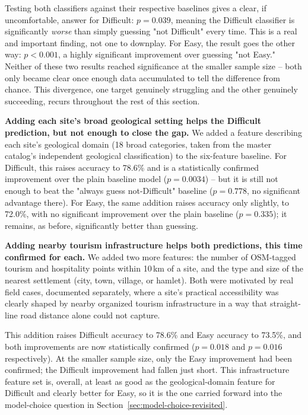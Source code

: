 \documentclass[11pt,a4paper]{article}
\begin{document}
Testing both classifiers against their respective baselines gives a clear, if uncomfortable, answer for Difficult: $p=0.039$, meaning the Difficult classifier is significantly \emph{worse} than simply guessing "not Difficult" every time. This is a real and important finding, not one to downplay. For Easy, the result goes the other way: $p<0.001$, a highly significant improvement over guessing "not Easy." Neither of these two results reached significance at the smaller sample size -- both only became clear once enough data accumulated to tell the difference from chance. This divergence, one target genuinely struggling and the other genuinely succeeding, recurs throughout the rest of this section.

\textbf{Adding each site's broad geological setting helps the Difficult prediction, but not enough to close the gap.} We added a feature describing each site's geological domain (18 broad categories, taken from the master catalog's independent geological classification) to the six-feature baseline. For Difficult, this raises accuracy to 78.6\% and is a statistically confirmed improvement over the plain baseline model ($p=0.0034$) -- but it is still not enough to beat the "always guess not-Difficult" baseline ($p=0.778$, no significant advantage there). For Easy, the same addition raises accuracy only slightly, to 72.0\%, with no significant improvement over the plain baseline ($p=0.335$); it remains, as before, significantly better than guessing.

\textbf{Adding nearby tourism infrastructure helps both predictions, this time confirmed for each.} We added two more features: the number of OSM-tagged tourism and hospitality points within 10\,km of a site, and the type and size of the nearest settlement (city, town, village, or hamlet). Both were motivated by real field cases, documented separately, where a site's practical accessibility was clearly shaped by nearby organized tourism infrastructure in a way that straight-line road distance alone could not capture.

This addition raises Difficult accuracy to 78.6\% and Easy accuracy to 73.5\%, and both improvements are now statistically confirmed ($p=0.018$ and $p=0.016$ respectively). At the smaller sample size, only the Easy improvement had been confirmed; the Difficult improvement had fallen just short. This infrastructure feature set is, overall, at least as good as the geological-domain feature for Difficult and clearly better for Easy, so it is the one carried forward into the model-choice question in Section~\ref{sec:model-choice-revisited}.
\end{document}
